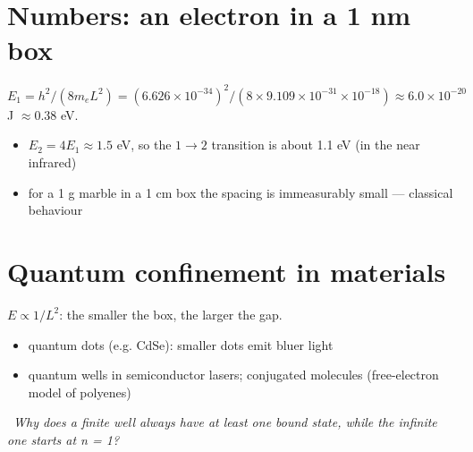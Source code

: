 \documentclass[11pt]{article}
\newcommand\knotetime[1]{\leavevmode\llap{\color{knotemuted}\scriptsize #1\hspace{1em}}}
\newcommand\knotequestion[2][]{\par\noindent#1{\color{knoteaccent}\textbf{?}}~\emph{#2}\par}
\newenvironment{knotechunk}{}{}
\begin{document}
\begin{knotechunk}
\section{Numbers: an electron in a 1 nm box}

\knotetime{20:25}$E_1 = h^2/(8 m_e L^2) = (6.626\times10^{-34})^2 / (8 \times 9.109\times10^{-31} \times 10^{-18}) \approx 6.0\times10^{-20}$ J $\approx 0.38$ eV.

\begin{itemize}\setlength{\itemsep}{0pt}\setlength{\parskip}{0pt}
  \item $E_2 = 4E_1 \approx 1.5$ eV, so the $1 \to 2$ transition is about 1.1 eV (in the near infrared)
  \item for a 1 g marble in a 1 cm box the spacing is immeasurably small — classical behaviour
\end{itemize}
\end{knotechunk}

\begin{knotechunk}
\section{Quantum confinement in materials}

\knotetime{29:25}$E \propto 1/L^2$: the smaller the box, the larger the gap.

\begin{itemize}\setlength{\itemsep}{0pt}\setlength{\parskip}{0pt}
  \item quantum dots (e.g. CdSe): smaller dots emit bluer light
  \item quantum wells in semiconductor lasers; conjugated molecules (free-electron model of polyenes)
\end{itemize}

\knotequestion[\knotetime{30:40}]{Why does a finite well always have at least one bound state, while the infinite one starts at n = 1?}
\end{knotechunk}
\end{document}
